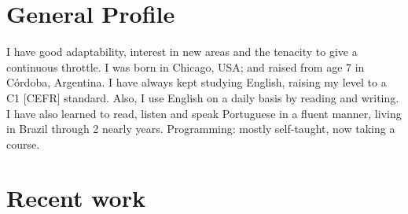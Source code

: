 \documentclass[a4paper,hidelinks]{twentysecondcv} %
\begin{document}
% 

\section{General Profile}

I have good adaptability, interest in new areas and the tenacity to give a continuous throttle. I was born in Chicago, USA; and raised from age 7 in Córdoba, Argentina. 
I have always kept %
studying %
English, raising my level to a C1 [CEFR] standard. Also, I use English on a  daily basis by reading and writing. I have also learned to read, listen and speak Portuguese in a fluent manner, living in Brazil through 2 nearly years. Programming: mostly self-taught, now taking a course.

\section{Recent work}

\begin{twentyshort} %
\end{twentyshort}
\end{document}
